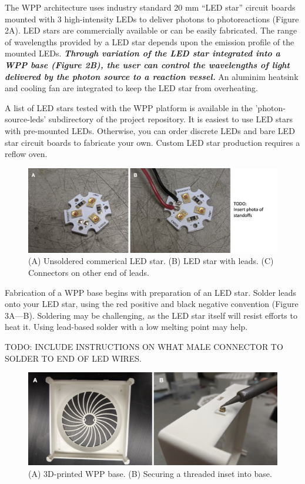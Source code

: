 \documentclass[11pt]{article}
\begin{document}
The WPP architecture uses industry standard 20 mm ``LED star'' circuit boards mounted with 3 high-intensity LEDs to deliver photons to photoreactions (Figure 2A).
LED stars are commercially available or can be easily fabricated. 
The range of wavelengths provided by a LED star depends upon the emission profile of the mounted LEDs.
\textbf{\textit{Through variation of the LED star integrated into a WPP base (Figure 2B), the user can control the wavelengths of light delivered by the photon source to a reaction vessel.}}
An aluminim heatsink and cooling fan are integrated to keep the LED star from overheating. 

A list of LED stars tested with the WPP platform is available in the 'photon-source-leds' subdirectory of the project repository. 
It is easiest to use LED stars with pre-mounted LEDs.
Otherwise, you can order discrete LEDs and bare LED star circuit boards to fabricate your own.
Custom LED star production requires a reflow oven. 

\begin{figure}[H]
	\includegraphics[width=\textwidth]{"./fig3.png"}
	\caption{(A) Unsoldered commerical LED star. (B) LED star with leads. (C) Connectors on other end of leads.}
\end{figure}

Fabrication of a WPP base begins with preparation of an LED star. 
Solder leads onto your LED star, using the red positive and black negative convention (Figure 3A---B).
Soldering may be challenging, as the LED star itself will resist efforts to heat it.
Using lead-based solder with a low melting point may help.

TODO: INCLUDE INSTRUCTIONS ON WHAT MALE CONNECTOR TO SOLDER TO END OF LED WIRES. 

\begin{figure}[H]
	\includegraphics[width=\textwidth]{"./fig4.png"}
	\caption{(A) 3D-printed WPP base. (B) Securing a threaded inset into base.}
\end{figure}
\end{document}
